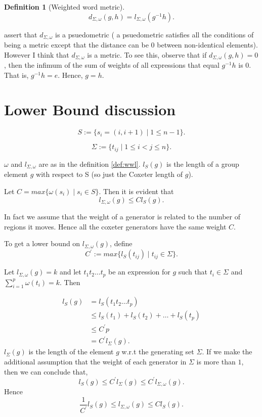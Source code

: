 \documentclass{article}
\newtheorem{definition}{Definition}
\begin{document}
\begin{definition}[Weighted word metric]
 \[d_{\Sigma,\omega}(g,h)=l_{\Sigma,\omega}(g^{-1}h).\]
\end{definition}

\citep{abels2004reductive} assert that $d_{\Sigma,\omega}$ is a psuedometric ( a psuedometric satisfies all the conditions of being a metric except that the distance can be 0 between non-identical elements). However I think that $d_{\Sigma,\omega}$ is a metric. To see this, observe that if $d_{\Sigma,\omega}(g,h)=0$, then the infimum of the sum of weights of all expressions that equal $g^{-1}h$ is 0. That is, $g^{-1}h=e$. Hence, $g = h$.
\section{Lower Bound discussion}
\[S := \{s_i=(i,i+1) \mid 1 \leq n-1\}.\]

\[\Sigma := \{t_{ij} \mid 1 \leq i < j \leq n\}.\]

$\omega$ and $l_{\Sigma,\omega}$ are as in the definition \ref{def:wwl}. $l_{S}(g)$ is the length of a group element $g$ with respect to S (so just the Coxeter length of $g$).  

Let $C=max\{\omega(s_i) \mid s_i \in S\}$. Then it is evident that 
\[l_{\Sigma,\omega}(g) \leq C l_S(g).\]

In fact we assume that the weight of a generator is related to the number of regions it moves. Hence all the coxeter generators have the same weight $C$.

To get a lower bound on $l_{\Sigma,\omega}(g)$, define
\[C^{\prime} := max \{l_S(t_{ij}) \mid t_{ij} \in \Sigma\}.\]

Let  $l_{\Sigma,\omega}(g) = k$ and let $t_1 t_2 \hdots t_p$ be an expression for $g$ such that $t_i \in \Sigma$ and $\sum_{i=1}^{p}{\omega(t_i)} = k$. Then

\begin{align*}
l_S(g) &= l_S(t_1 t_2 \hdots t_p) \\
& \leq l_S(t_1) + l_S(t_2) + \hdots + l_S(t_p) \\
& \leq C^{\prime}p \\
& = C^{\prime} l_{\Sigma}(g).
\end{align*}
$l_{\Sigma}(g)$ is the length of the element $g$ w.r.t the generating set $\Sigma$. If we make the additional assumption that the weight of each generator in $\Sigma$ is more than $1$, then we can conclude that,
\[l_S(g) \leq C^{\prime}l_{\Sigma}(g) \leq C^{\prime}l_{\Sigma, \omega}(g).\]
Hence 
\[\frac{1}{C^{\prime}}l_S(g) \leq l_{\Sigma,\omega}(g) \leq C l_S(g).\]
\end{document}
